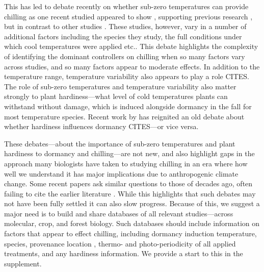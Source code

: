 \documentclass[11pt]{article}
\begin{document}
This has led to debate recently on whether sub-zero temperatures can provide chilling as one recent studied appeared to show \citep{baum2021}, supporting previous research \citep{Jones:2012,Sonsteby:2014aa}, but in contrast to other studies \citep{lamb1948effect,cook2005freezing,Man:2010aa}. These studies, however, vary in a number of additional factors including the species they study, the full conditions under which cool temperatures were applied etc.. This debate highlights the complexity of identifying the dominant controllers on chilling when so many factors vary across studies, and so many factors appear to moderate effects. In addition to the temperature range, temperature variability also appears to play a role CITES. The role of sub-zero temperatures and temperature variability also matter strongly to plant hardiness---what level of cold temperatures plants can withstand without damage, which is induced alongside dormancy in the fall for most temperature species. Recent work by \citet{kovaleskipreprint} has reignited an old debate about whether hardiness influences dormancy CITES---or vice versa. 

These debates---about the importance of sub-zero temperatures and plant hardiness to dormancy and chilling---are not new, and also highlight gaps in the approach many biologists have taken to studying chilling in an era where how well we understand it has major implications due to anthropogenic climate change. Some recent papers  ask similar questions to those of decades ago, often failing to cite the earlier literature \citep[e.g.,][]{lamb1948effect,Man:2010aa,baum2021}. While this highlights that such debates may not have been fully settled it can also slow progress. Because of this, we suggest a major need is to build and share databases of all relevant studies---across molecular, crop, and forest biology. Such databases should include information on factors that appear to effect chilling, including dormancy induction temperature, species, provenance location  \citep[as different populations may need different chilling][]{campbell1979,leinonen1996dependence}, thermo- and photo-periodicity of all applied treatments, and any hardiness information. We provide a start to this in the supplement. %

\end{document}
